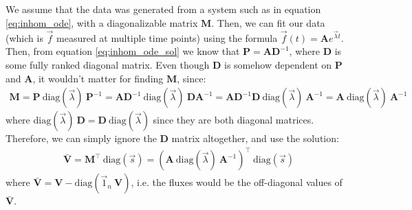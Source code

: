 \documentclass{article}
\begin{document}
We assume that the data was generated from a system such as in equation \ref{eq:inhom_ode}, with a diagonalizable matrix $\mathbf{M}$. Then, we can fit our data (which is $\vec{f}$ measured at multiple time points) using the formula $\vec{f}(t) = \mathbf{A} e^{\vec{\lambda} t}$. Then, from equation \ref{eq:inhom_ode_sol} we know that $\mathbf{P} = \mathbf{A} \mathbf{D}^{-1}$, where $\mathbf{D}$ is some fully ranked diagonal matrix. Even though $\mathbf{D}$ is somehow dependent on $\mathbf{P}$ and $\mathbf{A}$, it wouldn't matter for finding $\mathbf{M}$, since:
\begin{eqnarray}
    \mathbf{M} = \mathbf{P}~\text{diag}(\vec{\lambda})~\mathbf{P}^{-1} = \mathbf{A}\mathbf{D}^{-1}~\text{diag}(\vec{\lambda})~\mathbf{D}\mathbf{A}^{-1} = 
    \mathbf{A}\mathbf{D}^{-1}\mathbf{D}~\text{diag}(\vec{\lambda})~\mathbf{A}^{-1} = 
    \mathbf{A}~\text{diag}(\vec{\lambda})~\mathbf{A}^{-1}
\end{eqnarray}
where $\text{diag}(\vec{\lambda})~\mathbf{D} = \mathbf{D}~\text{diag}(\vec{\lambda})$ since they are both diagonal matrices. Therefore, we can simply ignore the $\mathbf{D}$ matrix altogether, and use the solution:
\begin{eqnarray}
    \mathbf{\bar{V}} = \mathbf{M}^\top~\text{diag}(\vec{s}) = \left(\mathbf{A}~\text{diag}(\vec{\lambda})~\mathbf{A}^{-1} \right)^\top~\text{diag}(\vec{s})
\end{eqnarray}
where $\mathbf{\bar{V}} = \mathbf{V} - \text{diag}(\vec{1}_n~\mathbf{V})$, i.e. the fluxes would be the off-diagonal values of $\mathbf{\bar{V}}$.




\end{document}
